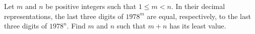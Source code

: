 Let $ m$ and $ n$ be positive integers such that $ 1 \le m < n$.  In their decimal representations, the last three digits of $ 1978^m$ are equal, respectively, to the last three digits of $ 1978^n$.  Find $ m$ and $ n$ such that $ m + n$ has its least value.